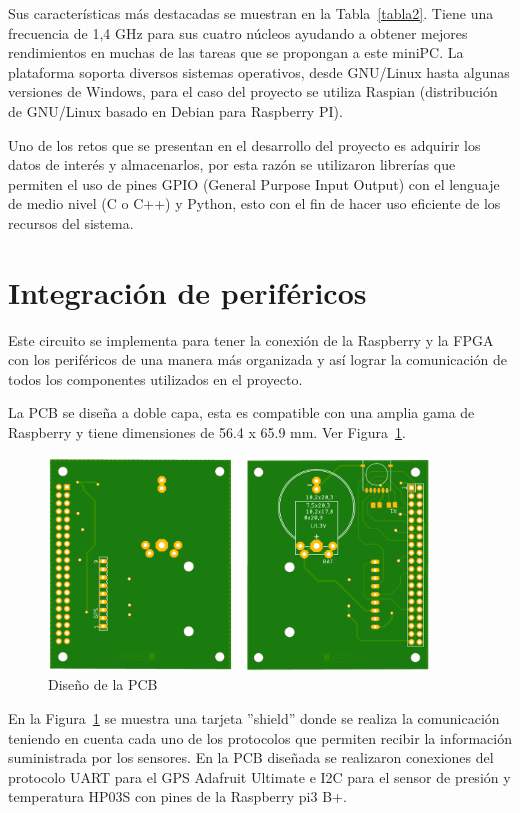 Sus características más destacadas se muestran en la Tabla~\ref{tabla2}. Tiene una frecuencia de 1,4 GHz para sus cuatro núcleos  ayudando a obtener mejores rendimientos en muchas de las tareas que se propongan a este miniPC. 
La plataforma soporta diversos sistemas operativos, desde GNU/Linux hasta algunas versiones de Windows, para el caso del proyecto se utiliza Raspian (distribución de GNU/Linux basado en Debian para Raspberry PI).

Uno de los retos que se presentan en el desarrollo del proyecto es adquirir los datos de interés y almacenarlos, por esta razón se utilizaron librerías que permiten el uso de pines GPIO (General Purpose Input Output) con el lenguaje de medio nivel (C o C++) y Python, esto con el fin de hacer uso eficiente de los recursos del sistema.


\section{Integración de periféricos}
Este circuito se implementa para tener la conexión de la Raspberry y la FPGA con los periféricos de una manera más organizada y así lograr la comunicación de todos los componentes utilizados en el proyecto.

La PCB se diseña a doble capa, esta es compatible con una amplia gama de Raspberry y tiene dimensiones de 56.4 x 65.9 mm.
Ver Figura~\ref{pcb}.

\begin{figure}[H]
\includegraphics[width=0.90\textwidth]{Figs/pcb_eagle.PNG} 
\centering
\caption{Diseño de la PCB}
\label{pcb}
\end{figure}

En la Figura~\ref{pcb} se muestra una tarjeta ''shield'' donde se realiza la comunicación teniendo en cuenta cada uno de los protocolos que permiten recibir la información suministrada por los sensores.
En la PCB diseñada se realizaron conexiones del protocolo UART para el GPS Adafruit Ultimate e I2C para el sensor de presión y temperatura HP03S con pines de la Raspberry pi3 B+. 

